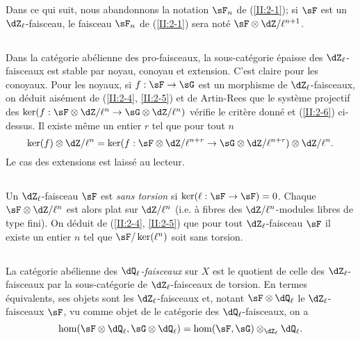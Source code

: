 Dans ce qui suit, nous abandonnons la notation $\sF_n$ de (\ref{II:2-1}); si 
$\sF$ est un $\dZ_\ell$-faisceau, le faisceau $\sF_n$ de (\ref{II:2-1}) sera 
noté $\sF\otimes\dZ/\ell^{n+1}$. 





\subsection{}\label{II:2-7}

Dans la catégorie abélienne des pro-faisceaux, la sous-catégorie épaisse des 
$\dZ_\ell$-faisceaux est stable par noyau, conoyau et extension. C'est claire 
pour les conoyaux. Pour les noyaux, si $f:\sF\to\sG$ est un morphisme de 
$\dZ_\ell$-faisceaux, on déduit aisément de (\ref{II:2-4}, \ref{II:2-5}) 
et de Artin-Rees que le système projectif des 
$\ker(f:\sF\otimes\dZ/\ell^n\to\sG\otimes\dZ/\ell^n)$ vérifie le critère 
donné et (\ref{II:2-6}) ci-dessus. Il existe même un entier $r$ tel que pour 
tout $n$ 
\[
  \ker(f)\otimes\dZ/\ell^n = \ker(f:\sF\otimes\dZ/\ell^{n+r}\to\sG\otimes\dZ/\ell^{n+r})\otimes\dZ/\ell^n \text{.}
\]
Le cas des extensions est laissé au lecteur. 





\subsection{}\label{II:2-8}

Un $\dZ_\ell$-faisceau $\sF$ est \emph{sans torsion} si 
$\ker(\ell:\sF\to\sF) = 0$. Chaque $\sF\otimes\dZ/\ell^n$ est alors plat sur 
$\dZ/\ell^n$ (i.e. à fibres des $\dZ/\ell^n$-modules libres de type fini). On 
déduit de (\ref{II:2-4}, \ref{II:2-5}) que pour tout $\dZ_\ell$-faisceau 
$\sF$ il existe un entier $n$ tel que $\sF/\ker(\ell^n)$ soit sans torsion. 





\subsection{}\label{II:2-9}

La catégorie abélienne des \emph{$\dQ_\ell$-faisceaux} sur $X$ est le 
quotient de celle des $\dZ_\ell$-faisceaux par la sous-catégorie de 
$\dZ_\ell$-faisceaux de torsion. En termes équivalents, ses objets sont les 
$\dZ_\ell$-faisceaux et, notant $\sF\otimes\dQ_\ell$ le $\dZ_\ell$-faisceaux 
$\sF$, vu comme objet de le catégorie des $\dQ_\ell$-faisceaux, on a 
\[
  \hom(\sF\otimes\dQ_\ell,\sG\otimes\dQ_\ell) = \hom(\sF,\sG)\otimes_{\dZ_\ell}\dQ_\ell \text{.}
\]


